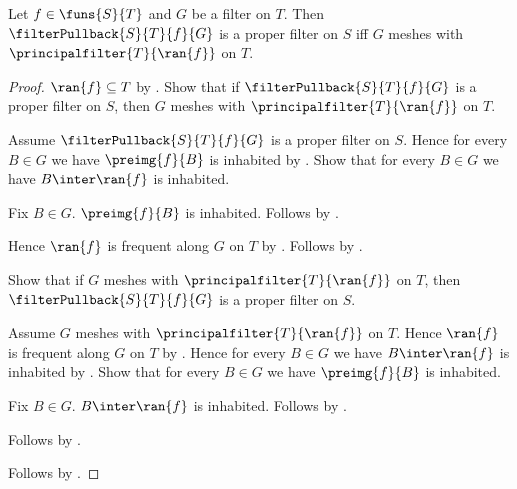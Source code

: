 \begin{theorem}\label{filter_pullback_is_proper_iff_meshes_range}
    Let $f\in\funs{S}{T}$ and $G$ be a filter on $T$.
    Then $\filterPullback{S}{T}{f}{G}$ is a proper filter on $S$ iff
        $G$ meshes with $\principalfilter{T}{\ran{f}}$ on $T$.
\end{theorem}
\begin{proof}
    $\ran{f}\subseteq T$ by .
    Show that if $\filterPullback{S}{T}{f}{G}$ is a proper filter on $S$,
        then $G$ meshes with $\principalfilter{T}{\ran{f}}$ on $T$.
    \begin{subproof}
        Assume $\filterPullback{S}{T}{f}{G}$ is a proper filter on $S$.
        Hence for every $B\in G$ we have $\preimg{f}{B}$ is inhabited by
            .
        Show that for every $B\in G$ we have
            $B\inter\ran{f}$ is inhabited.
        \begin{subproof}
            Fix $B\in G$.
            $\preimg{f}{B}$ is inhabited.
            Follows by .
        \end{subproof}
        Hence $\ran{f}$ is frequent along $G$ on $T$ by
            .
        Follows by .
    \end{subproof}
    Show that if $G$ meshes with $\principalfilter{T}{\ran{f}}$ on $T$,
        then $\filterPullback{S}{T}{f}{G}$ is a proper filter on $S$.
    \begin{subproof}
        Assume $G$ meshes with $\principalfilter{T}{\ran{f}}$ on $T$.
        Hence $\ran{f}$ is frequent along $G$ on $T$ by
            .
        Hence for every $B\in G$ we have $B\inter\ran{f}$ is inhabited by
            .
        Show that for every $B\in G$ we have $\preimg{f}{B}$ is inhabited.
        \begin{subproof}
            Fix $B\in G$.
            $B\inter\ran{f}$ is inhabited.
            Follows by .
        \end{subproof}
        Follows by .
    \end{subproof}
    Follows by \auto.
\end{proof}

